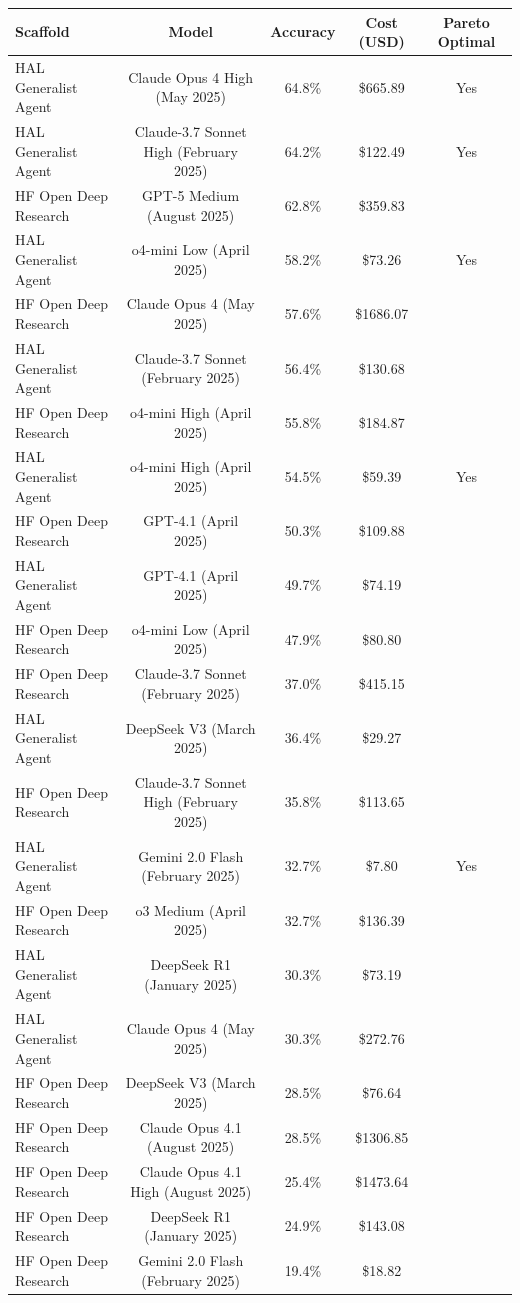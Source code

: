 \begin{tabular}{lcccc}
\toprule
Scaffold & Model & Accuracy & Cost (USD) & Pareto Optimal \\
\midrule
HAL Generalist Agent & Claude Opus 4 High (May 2025) & 64.8\% & \$665.89 & Yes \\
HAL Generalist Agent & Claude-3.7 Sonnet High (February 2025) & 64.2\% & \$122.49 & Yes \\
HF Open Deep Research & GPT-5 Medium (August 2025) & 62.8\% & \$359.83 &  \\
HAL Generalist Agent & o4-mini Low (April 2025) & 58.2\% & \$73.26 & Yes \\
HF Open Deep Research & Claude Opus 4 (May 2025) & 57.6\% & \$1686.07 &  \\
HAL Generalist Agent & Claude-3.7 Sonnet (February 2025) & 56.4\% & \$130.68 &  \\
HF Open Deep Research & o4-mini High (April 2025) & 55.8\% & \$184.87 &  \\
HAL Generalist Agent & o4-mini High (April 2025) & 54.5\% & \$59.39 & Yes \\
HF Open Deep Research & GPT-4.1 (April 2025) & 50.3\% & \$109.88 &  \\
HAL Generalist Agent & GPT-4.1 (April 2025) & 49.7\% & \$74.19 &  \\
HF Open Deep Research & o4-mini Low (April 2025) & 47.9\% & \$80.80 &  \\
HF Open Deep Research & Claude-3.7 Sonnet (February 2025) & 37.0\% & \$415.15 &  \\
HAL Generalist Agent & DeepSeek V3 (March 2025) & 36.4\% & \$29.27 &  \\
HF Open Deep Research & Claude-3.7 Sonnet High (February 2025) & 35.8\% & \$113.65 &  \\
HAL Generalist Agent & Gemini 2.0 Flash (February 2025) & 32.7\% & \$7.80 & Yes \\
HF Open Deep Research & o3 Medium (April 2025) & 32.7\% & \$136.39 &  \\
HAL Generalist Agent & DeepSeek R1 (January 2025) & 30.3\% & \$73.19 &  \\
HAL Generalist Agent & Claude Opus 4 (May 2025) & 30.3\% & \$272.76 &  \\
HF Open Deep Research & DeepSeek V3 (March 2025) & 28.5\% & \$76.64 &  \\
HF Open Deep Research & Claude Opus 4.1 (August 2025) & 28.5\% & \$1306.85 &  \\
HF Open Deep Research & Claude Opus 4.1 High (August 2025) & 25.4\% & \$1473.64 &  \\
HF Open Deep Research & DeepSeek R1 (January 2025) & 24.9\% & \$143.08 &  \\
HF Open Deep Research & Gemini 2.0 Flash (February 2025) & 19.4\% & \$18.82 &  \\
\bottomrule
\end{tabular}